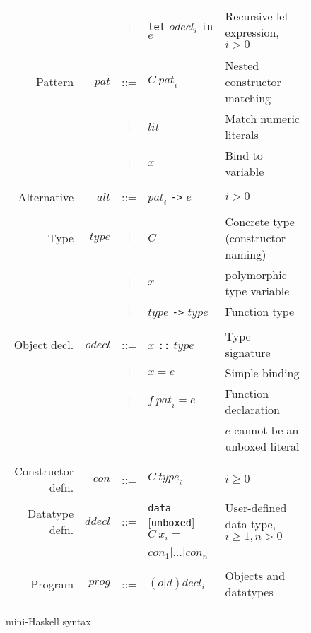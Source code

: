 \documentclass{llncs}
\begin{document}
\begin{figure}
\begin{tabular}{r r c l l}
                   &                     & $|$ & \texttt{let} $\mathit{odecl}_i$ \texttt{in} $e$
& Recursive let expression, $i > 0$ \\

\\


Pattern            & $\mathit{pat}$      & ::= & $C\ \mathit{pat}_i$
& Nested constructor matching \\
                   &                     & $|$ & $\mathit{lit}$
& Match numeric literals \\
                   &                     & $|$ & $x$
& Bind to variable \\

\\


Alternative        & $\mathit{alt}$      & ::= & $\mathit{pat}_i$ \texttt{->} $e$
& $i > 0$ \\

\\


Type               & $\mathit{type}$     & $|$ & $C$
& Concrete type (constructor naming) \\
                   &                     & $|$ & $x$
& polymorphic type variable \\
                   &                     & $|$ & $\mathit{type}$ \texttt{->} $\mathit{type}$
& Function type \\

\\


Object decl. & $\mathit{odecl}$    & ::= & $x$ \texttt{::} $\mathit{type}$
& Type signature \\
                   &                     & $|$ & $x = e$
& Simple binding \\
                   &                     & $|$ & $f\ \mathit{pat}_i = e$
& Function declaration \\
                   &                     &     &
& $e$ cannot be an unboxed literal \\

\\


Constructor defn. & $\mathit{con}$  & ::= & $C\ \mathit{type}_i$
& $i \ge 0$ \\

Datatype defn. &  $\mathit{ddecl}$ & ::= & \texttt{data} 
                                                 [\texttt{unboxed}]
                                                 $C\ x_i =$ 
& User-defined data type, $i \ge 1, n > 0$ \\
                     &                   &     & $\mathit{con}_1 | \dots |
                                                 \mathit{con}_n$
& \\

\\


Program                & $\mathit{prog}$ & ::= & $(o|d)\mathit{decl}_i$
& Objects and datatypes

\end{tabular}
\label{fig:miniHaskell}
\caption{mini-Haskell syntax}
\end{figure}
\end{document}
